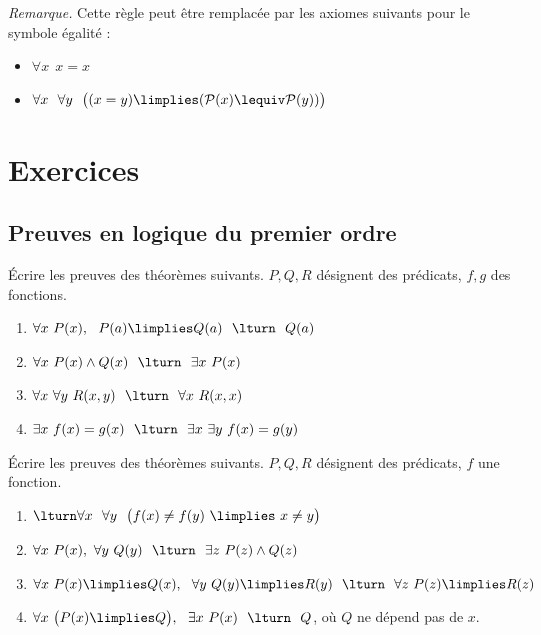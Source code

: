 \documentclass[11pt,class=report,crop=false]{standalone}
\begin{document}
\medskip

\emph{Remarque.} Cette règle peut être remplacée par les axiomes suivants pour le symbole égalité :
\begin{itemize}
	\item $\forall x \ \ x = x$
	
	\item $\forall x \ \ \forall y \ \ \big( (x = y) \limplies (\mathcal{P}(x) \lequiv \mathcal{P}(y)) \big)$
\end{itemize}



\section*{Exercices}

\subsection*{Preuves en logique du premier ordre}

\begin{exercicecours}
Écrire les preuves des théorèmes suivants. $P, Q, R$ désignent des prédicats, $f, g$ des fonctions.
\begin{enumerate}
	
	\item $\forall x \ P(x), \ \ P(a) \limplies Q(a) \ \ \lturn \ \ Q(a)$ 
	
	\item $\forall x \ P(x) \land Q(x) \ \ \lturn \ \ \exists x \ P(x)$
	
	\item $\forall x \ \forall y \ R(x,y) \ \ \lturn \ \ \forall x \ R(x,x)$
	
	\item $\exists x  \ f(x)=g(x) \ \ \lturn \ \ \exists x \ \exists y \ f(x)=g(y)$

\end{enumerate}
\end{exercicecours}


\begin{exercicecours}
	Écrire les preuves des théorèmes suivants. $P, Q, R$ désignent des prédicats, $f$ une fonction.
	\begin{enumerate}
		
		\item $\lturn \forall x \ \ \forall y \ \ \big( f(x) \neq f(y) \  \limplies \ x \neq y \big)$
		
		\item $\forall x \ P(x), \ \forall y \ Q(y) \ \ \lturn \ \ \exists z \ P(z) \land Q(z)$
		
		\item $\forall x \ P(x) \limplies Q(x), \ \ \forall y \ Q(y) \limplies R(y)
		\ \ \lturn \ \ \forall z \ P(z) \limplies R(z)$
		
		\item $\forall x \ \big( P(x) \limplies Q \big), \ \ \exists x  \ P(x) \ \ \lturn \ \ Q$, où $Q$ ne dépend pas de $x$.
		
	\end{enumerate}
\end{exercicecours}
\end{document}
